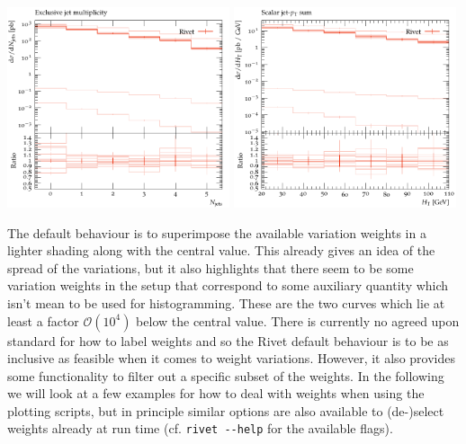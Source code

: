 \documentclass[10pt,fleqn]{scrartcl}
\theoremstyle{exstyle}
\begin{document}
\begin{center}
\includegraphics[width=0.49\textwidth]{figures/jets_excl_all_weights.pdf}
\includegraphics[width=0.49\textwidth]{figures/HT_all_weights.pdf}
\end{center}

The default behaviour is to superimpose the available variation weights in a lighter
shading along with the central value. This already gives an idea of the spread of
the variations, but it also highlights that there seem to be some variation weights 
in the setup that correspond to some auxiliary quantity which isn't mean to be used
for histogramming. These are the two curves which lie at least a factor $\mathcal{O}(10^4)$
below the central value. There is currently no agreed upon standard for how to label
weights and so the Rivet default behaviour is to be as inclusive as feasible when
it comes to weight variations. However, it also provides some functionality to filter
out a specific subset of the weights. In the following we will look at a few examples
for how to deal with weights when using the plotting scripts, but in principle similar
options are also available to (de-)select weights already at run time 
(cf. \verb|rivet --help| for the available flags).
\end{document}

